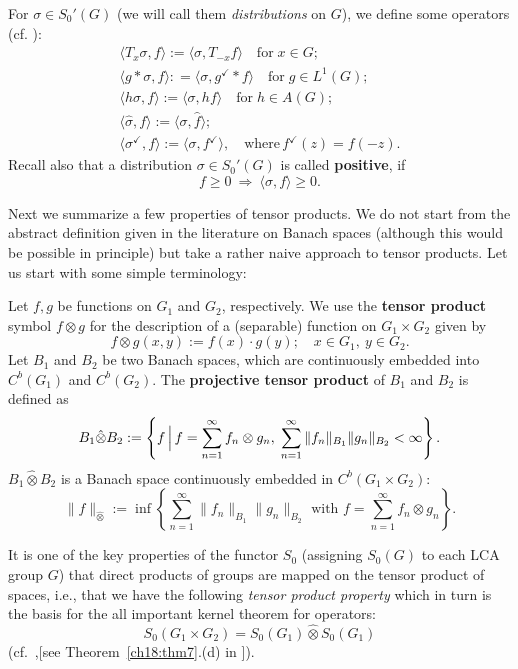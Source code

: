 \documentclass[graybox]{svmult}
\newcommand\checkm{{^\checkmark}}  %
\begin{document}
For   $\sigma \in {S_0{ '}(G)}$ (we will call them \textit{distributions} on $G$),
we define some operators (cf. \cite{fe89-2}):
\begin{gather*}
\langle T_x\sigma ,f\rangle:= \langle\sigma ,T_{-x}f\rangle \quad
\text{for} \; x\in G;\\
\langle g\ast \sigma ,f\rangle:
=\langle\sigma , {g}\checkm \ast f \rangle \quad
\text{for} \; g \in L^1(G);\\
\langle h\sigma ,f \rangle:=\langle\sigma ,hf\rangle \quad
\text{for} \; h\in A(G);\\
\langle \hat{\sigma},f\rangle := \langle\sigma ,\hat{f}\rangle;\\
\langle {\sigma}\checkm ,f\rangle:=\langle\sigma ,{f}\checkm \rangle,
  \quad \text{where} \,  {f}\checkm(z) = f(-z).
\end{gather*}
%
Recall also that a  distribution $\sigma \in {S_0{ '}(G)}$
is called \textbf{positive}, if
\[
f\geq 0\:\Longrightarrow \:\langle\sigma ,f\rangle\geq 0.
\]

Next we summarize a few properties of tensor products.
We do not start from the abstract definition given in the
literature on Banach spaces (although this would be possible
in principle) but take a rather naive approach to tensor
products. Let us start with some  simple terminology:

Let $f,g$ be functions on $G_{1}$ and $G_{2}$,
respectively. We use the  \textbf{tensor product} symbol
$f\otimes g$ for the description of a (separable) function on $G_{1}\times G_{2}$ given by
\[
f \otimes  g(x,y) := f(x)\cdot g(y);\quad x \in  G_{1},\:y \in  G_{2}.
\]
Let $B_{1}$ and $B_{2}$ be two Banach spaces, which are
continuously embedded
into $C^{b}(G_{1})$ and $C^{b}(G_{2})$.
The \textbf{projective tensor
product} of $B_{1}$ and $B_{2}$ is defined as
\[
B_{1} \hat{\otimes } B_{2} := \left\{ f \, \Big{|} \, f = \sum^{\infty
}_{n=1}f_{n} \otimes g_{n} , \; \sum^{\infty }_{n=1}\| f_{n}\| _{B_{1}}\|
g_{n}\| _{B_{2}} < \infty \right\}.
\]
$B_{1} \hat{\otimes } B_{2}$ is a Banach space continuously
embedded in $C^{b}(G_{1}\times G_{2})$:
\[
\| f\|_{\hat{\otimes}}:= \inf  \left\{  \sum^{\infty
}_{n=1}\|
f_{n}\| _{B_{1}}\| g_{n}\| _{B_{2}} \text{ with }f
= \sum^{\infty }_{n=1}f_{n}\otimes g_{n} \right\}.
\]

It is one of the key properties of the functor
$S_0$ (assigning ${S_{0}(G)}$ to each LCA group $G$)
that direct products of groups are
mapped on the tensor product of spaces, i.e.,  that
we have the following \textit{tensor product
property} which in turn is the basis for the all
important kernel theorem for operators:
\[
S_0(G_1 \times G_2) = S_{0}(G_{1}) \hat{\otimes}  S_{0}(G_{1})
\]
(cf.\ \cite{cofelu08,lo83-1},[see Theorem~\ref{ch18:thm7}.(d) in \cite{fe81-2}]).
\end{document}
